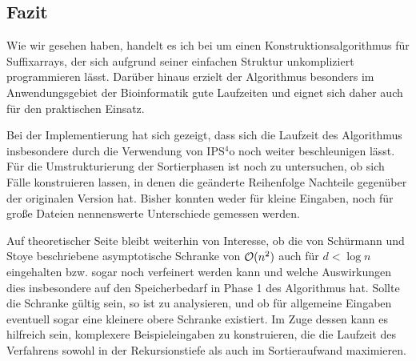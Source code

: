 \subsection{Fazit}
\label{bpr:fazit}

Wie wir gesehen haben, handelt es ich bei \bpr um einen Konstruktionsalgorithmus für Suffixarrays, der sich aufgrund seiner einfachen Struktur unkompliziert programmieren lässt. Darüber hinaus erzielt der Algorithmus besonders im Anwendungsgebiet der Bioinformatik gute Laufzeiten und eignet sich daher auch für den praktischen Einsatz.\par
Bei der Implementierung hat sich gezeigt, dass sich die Laufzeit des Algorithmus insbesondere durch die Verwendung von IPS\(^4\)o noch weiter beschleunigen lässt. Für die Umstrukturierung der Sortierphasen ist noch zu untersuchen, ob sich Fälle konstruieren lassen, in denen die geänderte Reihenfolge Nachteile gegenüber der originalen Version hat. Bisher konnten weder für kleine Eingaben, noch für große Dateien nennenswerte Unterschiede gemessen werden.\par\smallskip
Auf theoretischer Seite bleibt weiterhin von Interesse, ob die von Schürmann und Stoye beschriebene asymptotische Schranke von \(\mathcal{O}(n^2)\) \cite[Kapitel~5]{saca:2} auch für \(d < \log n\) eingehalten bzw. sogar noch verfeinert werden kann und welche Auswirkungen dies insbesondere auf den Speicherbedarf in Phase 1 des Algorithmus hat. Sollte die Schranke gültig sein, so ist zu analysieren, und ob für allgemeine Eingaben eventuell sogar eine kleinere obere Schranke existiert. Im Zuge dessen kann es hilfreich sein, komplexere Beispieleingaben zu konstruieren, die die Laufzeit des Verfahrens sowohl in der Rekursionstiefe als auch im Sortieraufwand maximieren.
